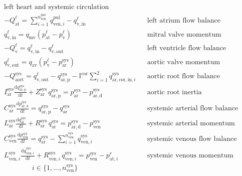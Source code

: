 \documentclass[a4paper,12pt]{report}
\begin{document}
\begin{align}
&\text{left heart and systemic circulation} && \nonumber\\
&-Q_{\mathrm{at}}^{\ell} = \sum\limits_{i=1}^{n_{\mathrm{ven}}^{\mathrm{pul}}}q_{\mathrm{ven},i}^{\mathrm{pul}} - q_{\mathrm{v,in}}^{\ell} && \text{left atrium flow balance}\nonumber\\
&q_{\mathrm{v,in}}^{\ell} = q_{\mathrm{mv}}(p_{\mathrm{at}}^{\ell}-p_{\mathrm{v}}^{\ell}) && \text{mitral valve momentum}\label{eq:mv_flow}\\
&-Q_{\mathrm{v}}^{\ell} = q_{\mathrm{v,in}}^{\ell} - q_{\mathrm{v,out}}^{\ell} && \text{left ventricle flow balance}\nonumber\\
&q_{\mathrm{v,out}}^{\ell} = q_{\mathrm{av}}(p_{\mathrm{v}}^{\ell}-p_{\mathrm{ar}}^{\mathrm{sys}}) && \text{aortic valve momentum}\label{eq:av_flow}\\
&-Q_{\mathrm{aort}}^{\mathrm{sys}} = q_{\mathrm{v,out}}^{\ell} - q_{\mathrm{ar,p}}^{\mathrm{sys}} - \mathbb{I}^{\mathrm{cor}}\sum\limits_{i=1}^{2}q_{\mathrm{ar,cor,in},i}^{\mathrm{sys}} && \text{aortic root flow balance}\nonumber\\
&I_{\mathrm{ar}}^{\mathrm{sys}} \frac{\mathrm{d}q_{\mathrm{ar,p}}^{\mathrm{sys}}}{\mathrm{d}t} + Z_{\mathrm{ar}}^{\mathrm{sys}}\,q_{\mathrm{ar,p}}^{\mathrm{sys}}=p_{\mathrm{ar}}^{\mathrm{sys}}-p_{\mathrm{ar,d}}^{\mathrm{sys}} && \text{aortic root inertia}\nonumber\\
&C_{\mathrm{ar}}^{\mathrm{sys}} \frac{\mathrm{d}p_{\mathrm{ar,d}}^{\mathrm{sys}}}{\mathrm{d}t} = q_{\mathrm{ar,p}}^{\mathrm{sys}} - q_{\mathrm{ar}}^{\mathrm{sys}} && \text{systemic arterial flow balance}\nonumber\\
&L_{\mathrm{ar}}^{\mathrm{sys}} \frac{\mathrm{d}q_{\mathrm{ar}}^{\mathrm{sys}}}{\mathrm{d}t} + R_{\mathrm{ar}}^{\mathrm{sys}}\,q_{\mathrm{ar}}^{\mathrm{sys}}=p_{\mathrm{ar,d}}^{\mathrm{sys}}-p_{\mathrm{ven}}^{\mathrm{sys}} && \text{systemic arterial momentum}\nonumber\\
&C_{\mathrm{ven}}^{\mathrm{sys}} \frac{\mathrm{d}p_{\mathrm{ven}}^{\mathrm{sys}}}{\mathrm{d}t} = q_{\mathrm{ar}}^{\mathrm{sys}}-\sum\limits_{i=1}^{n_{\mathrm{ven}}^{\mathrm{sys}}}q_{\mathrm{ven},i}^{\mathrm{sys}}\ && \text{systemic venous flow balance}\nonumber\\
&L_{\mathrm{ven},i}^{\mathrm{sys}} \frac{\mathrm{d}q_{\mathrm{ven},i}^{\mathrm{sys}}}{\mathrm{d}t} + R_{\mathrm{ven},i}^{\mathrm{sys}}\, q_{\mathrm{ven},i}^{\mathrm{sys}} = p_{\mathrm{ven}}^{\mathrm{sys}} - p_{\mathrm{at},i}^{r} && \text{systemic venous momentum}\nonumber\\
&\qquad\qquad i \in \{1,...,n_{\mathrm{ven}}^{\mathrm{sys}}\} && \nonumber
\end{align}
\end{document}

